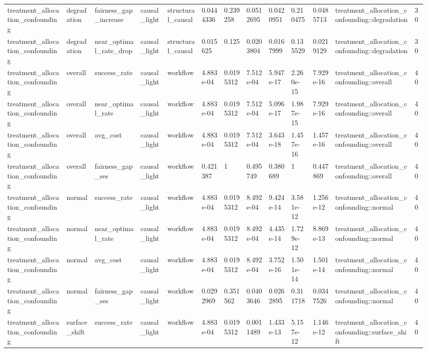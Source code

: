\begin{tabular}{lllllllllllll}
treatment\_allocation\_confounding & degradation & fairness\_gap\_increase & causal\_light & structural\_causal & 0.0444336 & 0.239258 & 0.0512695 & 0.0420951 & 0.210475 & 0.0485713 & treatment\_allocation\_confounding::degradation & 30 \\
treatment\_allocation\_confounding & degradation & near\_optimal\_rate\_drop & causal\_light & structural\_causal & 0.015625 & 0.125 & 0.0203804 & 0.0167999 & 0.135529 & 0.0219129 & treatment\_allocation\_confounding::degradation & 30 \\
treatment\_allocation\_confounding & overall & success\_rate & causal\_light & workflow & 4.883e-04 & 0.0195312 & 7.512e-04 & 5.947e-17 & 2.260e-15 & 7.929e-16 & treatment\_allocation\_confounding::overall & 40 \\
treatment\_allocation\_confounding & overall & near\_optimal\_rate & causal\_light & workflow & 4.883e-04 & 0.0195312 & 7.512e-04 & 5.096e-17 & 1.987e-15 & 7.929e-16 & treatment\_allocation\_confounding::overall & 40 \\
treatment\_allocation\_confounding & overall & avg\_cost & causal\_light & workflow & 4.883e-04 & 0.0195312 & 7.512e-04 & 3.643e-18 & 1.457e-16 & 1.457e-16 & treatment\_allocation\_confounding::overall & 40 \\
treatment\_allocation\_confounding & overall & fairness\_gap\_ses & causal\_light & workflow & 0.421387 & 1 & 0.495749 & 0.380689 & 1 & 0.447869 & treatment\_allocation\_confounding::overall & 40 \\
treatment\_allocation\_confounding & normal & success\_rate & causal\_light & workflow & 4.883e-04 & 0.0195312 & 8.492e-04 & 9.424e-14 & 3.581e-12 & 1.256e-12 & treatment\_allocation\_confounding::normal & 40 \\
treatment\_allocation\_confounding & normal & near\_optimal\_rate & causal\_light & workflow & 4.883e-04 & 0.0195312 & 8.492e-04 & 4.435e-14 & 1.729e-12 & 8.869e-13 & treatment\_allocation\_confounding::normal & 40 \\
treatment\_allocation\_confounding & normal & avg\_cost & causal\_light & workflow & 4.883e-04 & 0.0195312 & 8.492e-04 & 3.752e-16 & 1.501e-14 & 1.501e-14 & treatment\_allocation\_confounding::normal & 40 \\
treatment\_allocation\_confounding & normal & fairness\_gap\_ses & causal\_light & workflow & 0.0292969 & 0.351562 & 0.0403646 & 0.0262895 & 0.311718 & 0.0347526 & treatment\_allocation\_confounding::normal & 40 \\
treatment\_allocation\_confounding & surface\_shift & success\_rate & causal\_light & workflow & 4.883e-04 & 0.0195312 & 0.0011489 & 1.433e-13 & 5.157e-12 & 1.146e-12 & treatment\_allocation\_confounding::surface\_shift & 40 \\

\end{tabular}

